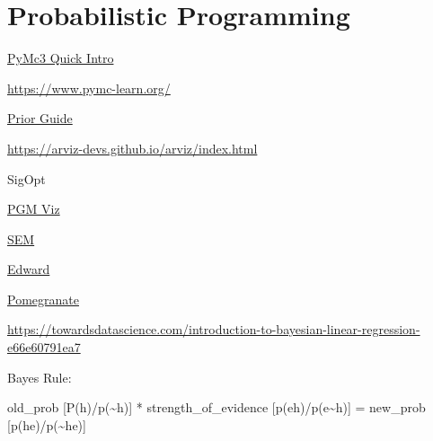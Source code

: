 \documentclass[]{book}
\begin{document}
\chapter{Probabilistic Programming}\label{probabilistic-programming}

\href{https://docs.google.com/presentation/d/1buknIrG5b8u0twrwvlxcTudIOdx68AlqDiST_A_jJ9g/edit\#slide=id.g4254d546f6_0_0}{PyMc3
Quick Intro}

\url{https://www.pymc-learn.org/}

\href{https://github.com/stan-dev/stan/wiki/Prior-Choice-Recommendations}{Prior
Guide}

\url{https://arviz-devs.github.io/arviz/index.html}

SigOpt

\href{http://daft-pgm.org}{PGM Viz}

\href{http://sachaepskamp.com/SEM2017}{SEM}

\href{http://edwardlib.org/}{Edward}

\href{http://pomegranate.readthedocs.io/en/latest/}{Pomegranate}

\url{https://towardsdatascience.com/introduction-to-bayesian-linear-regression-e66e60791ea7}

Bayes Rule:

old\_prob {[}P(h)/p(\textasciitilde{}h){]} * strength\_of\_evidence
{[}p(e\textbar{}h)/p(e\textbar{}\textasciitilde{}h){]} = new\_prob
{[}p(h\textbar{}e)/p(\textasciitilde{}h\textbar{}e){]}
\end{document}
